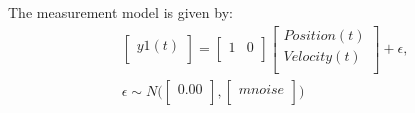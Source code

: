 \documentclass[fleqn]{article}
\begin{document}
The measurement model is given by:
\begin{align*}
&%
\begin{bmatrix}{}
  y1(t) \\ 
  \end{bmatrix}
 = %
\begin{bmatrix}{}
  1 & 0 \\ 
  \end{bmatrix}
\begin{bmatrix}{}
  Position(t) \\ 
  Velocity(t) \\ 
  \end{bmatrix}
+ \epsilon,\\&\epsilon\sim N\Big(%
\begin{bmatrix}{}
  0.00 \\ 
  \end{bmatrix}
,%
\begin{bmatrix}{}
  mnoise \\ 
  \end{bmatrix}
\Big)\end{align*}
\end{document}
